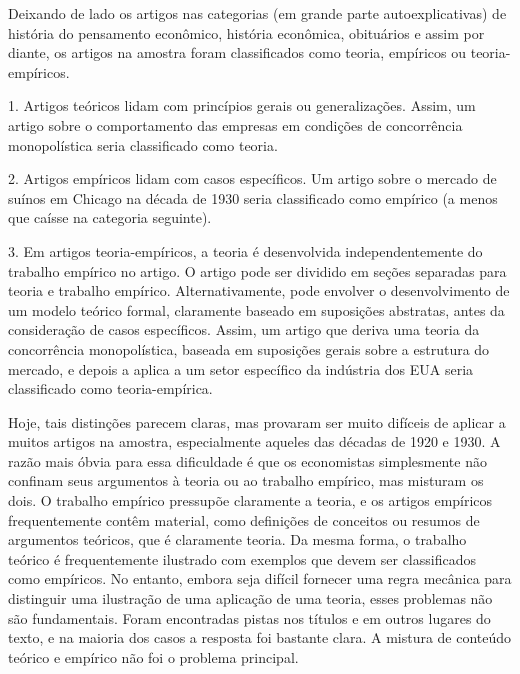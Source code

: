 \documentclass[12pt]{article}
\begin{document}
Deixando de lado os artigos nas categorias (em grande parte autoexplicativas) de história do pensamento econômico, história econômica, obituários e assim por diante, os artigos na amostra foram classificados como teoria, empíricos ou teoria-empíricos.

1. Artigos teóricos lidam com princípios gerais ou generalizações. Assim, um artigo sobre o comportamento das empresas em condições de concorrência monopolística seria classificado como teoria.

2. Artigos empíricos lidam com casos específicos. Um artigo sobre o mercado de suínos em Chicago na década de 1930 seria classificado como empírico (a menos que caísse na categoria seguinte).

3. Em artigos teoria-empíricos, a teoria é desenvolvida independentemente do trabalho empírico no artigo. O artigo pode ser dividido em seções separadas para teoria e trabalho empírico. Alternativamente, pode envolver o desenvolvimento de um modelo teórico formal, claramente baseado em suposições abstratas, antes da consideração de casos específicos. Assim, um artigo que deriva uma teoria da concorrência monopolística, baseada em suposições gerais sobre a estrutura do mercado, e depois a aplica a um setor específico da indústria dos EUA seria classificado como teoria-empírica.

Hoje, tais distinções parecem claras, mas provaram ser muito difíceis de aplicar a muitos artigos na amostra, especialmente aqueles das décadas de 1920 e 1930. A razão mais óbvia para essa dificuldade é que os economistas simplesmente não confinam seus argumentos à teoria ou ao trabalho empírico, mas misturam os dois. O trabalho empírico pressupõe claramente a teoria, e os artigos empíricos frequentemente contêm material, como definições de conceitos ou resumos de argumentos teóricos, que é claramente teoria. Da mesma forma, o trabalho teórico é frequentemente ilustrado com exemplos que devem ser classificados como empíricos. No entanto, embora seja difícil fornecer uma regra mecânica para distinguir uma ilustração de uma aplicação de uma teoria, esses problemas não são fundamentais. Foram encontradas pistas nos títulos e em outros lugares do texto, e na maioria dos casos a resposta foi bastante clara. A mistura de conteúdo teórico e empírico não foi o problema principal.
\end{document}
